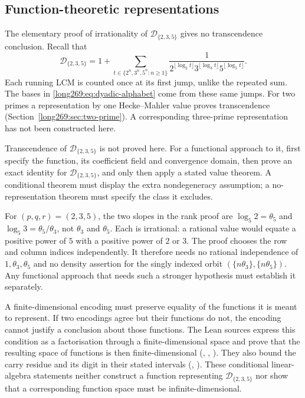 \documentclass[11pt]{article}
\theoremstyle{remark}
\theoremstyle{plain}
\begin{document}
\subsection{Function-theoretic representations}\label{long269:sec:function-representation}

The elementary proof of irrationality of $\mathcal D_{\{2,3,5\}}$ gives
no transcendence conclusion. Recall that
\[
 \mathcal D_{\{2,3,5\}}=1+
 \sum_{t\in\{2^n,3^n,5^n:n\ge1\}}
 \frac1{2^{\lfloor\log_2t\rfloor}3^{\lfloor\log_3t\rfloor}
             5^{\lfloor\log_5t\rfloor}}.
\]
Each running LCM is counted once at its first jump, unlike the repeated sum.
The bases in \eqref{long269:eq:dyadic-alphabet} come from these same jumps.
For two primes a representation by one Hecke--Mahler value proves
transcendence (Section~\ref{long269:sec:two-prime}). A corresponding
three-prime representation has not been constructed here.

\begin{problem}
\label{long269:prob:representation}
Transcendence of $\mathcal D_{\{2,3,5\}}$ is not proved here.  For a functional
approach to it, first specify the function, its coefficient field and
convergence domain, then prove an exact identity for $\mathcal D_{\{2,3,5\}}$,
and only then apply a stated value theorem.  A conditional theorem must
display the extra nondegeneracy assumption; a no-representation theorem
must specify the class it excludes.
\end{problem}

For $(p,q,r)=(2,3,5)$, the two slopes in the rank proof are
$\log_5 2=\theta_5$ and $\log_5 3=\theta_5/\theta_3$, not $\theta_3$ and
$\theta_5$.  Each is irrational: a rational value would equate a positive
power of $5$ with a positive power of $2$ or $3$.  The proof chooses the
row and column indices independently.  It therefore needs no rational
independence of $1,\theta_3,\theta_5$ and no density assertion for the
singly indexed orbit $(\{n\theta_3\},\{n\theta_5\})$.  Any functional
approach that needs such a stronger hypothesis must establish it separately.

A finite-dimensional encoding must preserve equality of the functions it
is meant to represent.  If two encodings agree but their functions do not,
the encoding cannot justify a conclusion about those functions.  The
Lean sources express this condition as a factorisation through
a finite-dimensional space and prove that the resulting space of
functions is then finite-dimensional
(,
,
).  They also bound the carry residue and its digit in their
stated intervals
(,
).  These conditional linear-algebra statements neither construct a
function representing $\mathcal D_{\{2,3,5\}}$ nor show that a corresponding
function space must be infinite-dimensional.
\end{document}
